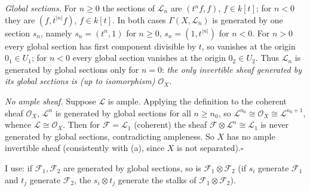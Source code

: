 \documentclass[11pt]{article}
\begin{document}
\emph{Global sections.} For $n\ge0$ the sections of $\mathcal L_n$ are $(t^nf,f)$, $f\in k[t]$; for $n<0$ they are $(f,t^{|n|}f)$, $f\in k[t]$. In both cases $\Gamma(X,\mathcal L_n)$ is generated by one section $s_n$, namely $s_n=(t^n,1)$ for $n\ge0$, $s_n=(1,t^{|n|})$ for $n<0$. For $n>0$ every global section has first component divisible by $t$, so vanishes at the origin $0_1\in U_1$; for $n<0$ every global section vanishes at the origin $0_2\in U_2$. Thus $\mathcal L_n$ is generated by global sections only for $n=0$: \emph{the only invertible sheaf generated by its global sections is (up to isomorphism) $\mathcal O_X$.}

\emph{No ample sheaf.} Suppose $\mathcal L$ is ample. Applying the definition to the coherent sheaf $\mathcal O_X$, $\mathcal L^n$ is generated by global sections for all $n\ge n_0$, so $\mathcal L^{n_0}\cong\mathcal O_X\cong\mathcal L^{n_0+1}$, whence $\mathcal L\cong\mathcal O_X$. Then for $\mathcal F=\mathcal L_1$ (coherent) the sheaf $\mathcal F\otimes\mathcal L^n\cong\mathcal L_1$ is never generated by global sections, contradicting ampleness. So $X$ has no ample invertible sheaf (consistently with (a), since $X$ is not separated).\hfill$\square$

\pf
I use: if $\mathcal F_1,\mathcal F_2$ are generated by global sections, so is $\mathcal F_1\otimes\mathcal F_2$ (if $s_i$ generate $\mathcal F_1$ and $t_j$ generate $\mathcal F_2$, the $s_i\otimes t_j$ generate the stalks of $\mathcal F_1\otimes\mathcal F_2$).
\end{document}
